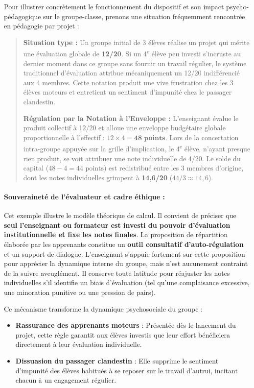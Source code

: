 Pour illustrer concrètement le fonctionnement du dispositif et son impact psycho-pédagogique sur le groupe-classe, prenons une situation fréquemment rencontrée en pédagogie par projet :

\begin{quote}
\textbf{Situation type :} Un groupe initial de 3 élèves réalise un projet qui mérite une évaluation globale de \textbf{12/20}. Si un 4\textsuperscript{e} élève peu investi s'incruste au dernier moment dans ce groupe sans fournir un travail régulier, le système traditionnel d'évaluation attribue mécaniquement un 12/20 indifférencié aux 4 membres. Cette notation produit une vive frustration chez les 3 élèves moteurs et entretient un sentiment d'impunité chez le passager clandestin.

\textbf{Régulation par la Notation à l'Enveloppe :} L'enseignant évalue le produit collectif à 12/20 et alloue une enveloppe budgétaire globale proportionnelle à l'effectif : $12 \times 4 = \mathbf{48\text{ points}}$. Lors de la concertation intra-groupe appuyée sur la grille d'implication, le 4\textsuperscript{e} élève, n'ayant presque rien produit, se voit attribuer une note individuelle de 4/20. Le solde du capital ($48 - 4 = 44\text{ points}$) est redistribué entre les 3 membres d'origine, dont les notes individuelles grimpent à \textbf{14,6/20} ($44 / 3 \approx 14,6$).
\end{quote}

\paragraph{Souveraineté de l'évaluateur et cadre éthique :} Cet exemple illustre le modèle théorique de calcul. Il convient de préciser que \textbf{seul l'enseignant ou formateur est investi du pouvoir d'évaluation institutionnelle et fixe les notes finales}. La proposition de répartition élaborée par les apprenants constitue un \textbf{outil consultatif d'auto-régulation} et un support de dialogue. L'enseignant s'appuie fortement sur cette proposition pour apprécier la dynamique interne du groupe, mais n'est aucunement contraint de la suivre aveuglément. Il conserve toute latitude pour réajuster les notes individuelles s'il identifie un biais d'évaluation (tel qu'une complaisance excessive, une minoration punitive ou une pression de pairs).

Ce mécanisme transforme la dynamique psychosociale du groupe :
\begin{itemize}[leftmargin=*]
    \item \textbf{Rassurance des apprenants moteurs} : Présentée dès le lancement du projet, cette règle garantit aux élèves investis que leur effort bénéficiera directement à leur évaluation individuelle.
    \item \textbf{Dissuasion du passager clandestin} : Elle supprime le sentiment d'impunité des élèves habitués à se reposer sur le travail d'autrui, incitant chacun à un engagement régulier.
\end{itemize}

